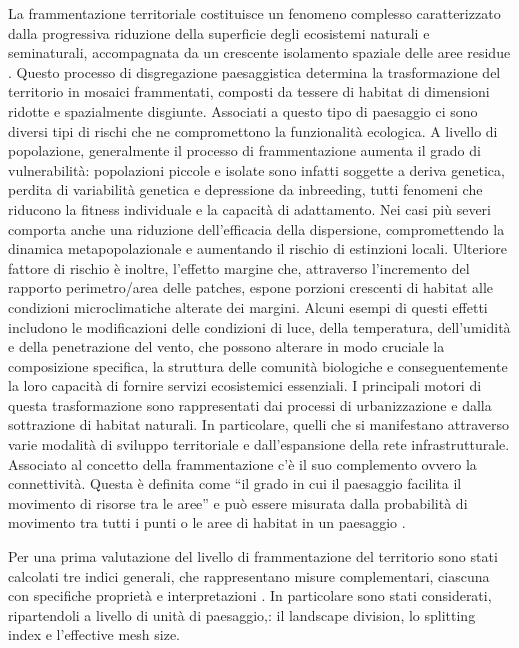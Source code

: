 \documentclass[
]{book}
\begin{document}
La frammentazione territoriale costituisce un fenomeno complesso caratterizzato dalla progressiva riduzione della superficie degli ecosistemi naturali e seminaturali, accompagnata da un crescente isolamento spaziale delle aree residue \citep{puttkerIndirectEffectsHabitat2020, lawrenceLandscapeFragmentationNatura2021, simaikaArtificialPondsIncrease2016}.
Questo processo di disgregazione paesaggistica determina la trasformazione del territorio in mosaici frammentati, composti da tessere di habitat di dimensioni ridotte e spazialmente disgiunte.
Associati a questo tipo di paesaggio ci sono diversi tipi di rischi che ne compromettono la funzionalità ecologica.
A livello di popolazione, generalmente il processo di frammentazione aumenta il grado di vulnerabilità: popolazioni piccole e isolate sono infatti soggette a deriva genetica, perdita di variabilità genetica e depressione da inbreeding, tutti fenomeni che riducono la fitness individuale e la capacità di adattamento.
Nei casi più severi comporta anche una riduzione dell'efficacia della dispersione, compromettendo la dinamica metapopolazionale e aumentando il rischio di estinzioni locali.
Ulteriore fattore di rischio è inoltre, l'effetto margine che, attraverso l'incremento del rapporto perimetro/area delle patches, espone porzioni crescenti di habitat alle condizioni microclimatiche alterate dei margini.
Alcuni esempi di questi effetti includono le modificazioni delle condizioni di luce, della temperatura, dell'umidità e della penetrazione del vento, che possono alterare in modo cruciale la composizione specifica, la struttura delle comunità biologiche e conseguentemente la loro capacità di fornire servizi ecosistemici essenziali.
I principali motori di questa trasformazione sono rappresentati dai processi di urbanizzazione e dalla sottrazione di habitat naturali.
In particolare, quelli che si manifestano attraverso varie modalità di sviluppo territoriale e dall'espansione della rete infrastrutturale.
Associato al concetto della frammentazione c'è il suo complemento ovvero la connettività.
Questa è definita come ``il grado in cui il paesaggio facilita il movimento di risorse tra le aree'' e può essere misurata dalla probabilità di movimento tra tutti i punti o le aree di habitat in un paesaggio \citep{taylorConnectivityVitalElement1993}.

Per una prima valutazione del livello di frammentazione del territorio sono stati calcolati tre indici generali, che rappresentano misure complementari, ciascuna con specifiche proprietà e interpretazioni \citep{jaegerLandscapeDivisionSplitting2000}.
In particolare sono stati considerati, ripartendoli a livello di unità di paesaggio,: il landscape division, lo splitting index e l'effective mesh size.
\end{document}
